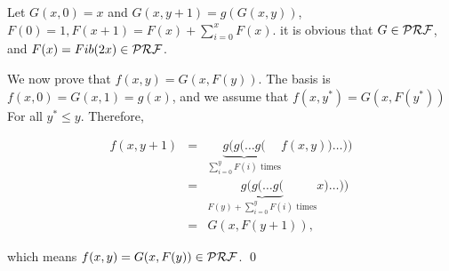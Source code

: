 
\begin{pf} \rm
 Let $G(x, 0) = x$ and $G(x, y + 1) = g(G(x, y))$,
 $F(0) = 1, F(x + 1) = F(x) + \sum_{i = 0}^{x} F(x)$. it is obvious that
 $G\in\mathcal{PRF}$, and $F(x) = Fib(2x) \in \mathcal{PRF}$.
 
 We now prove that $f(x, y) = G(x, F(y))$.
 The basis is $f(x, 0) = G(x, 1) = g(x)$, and we assume that
 $f(x, y^*) = G(x, F(y^*))$ For all $y^* \leq y$. Therefore, 

\[
 \begin{array}{rcl}
 f(x, y + 1)  & = &  \underbrace{g(g(\ldots g(}_{\sum_{i = 0}^{y} F(i)\textrm{ times}}
   f(x, y) )\ldots )) \\
 & = & \underbrace{g(g(\ldots g(}_{F(y) + \sum_{i = 0}^{y} F(i)\textrm{ times}}
   x )\ldots )) \\
   & = & G(x, F(y + 1)),
  \end{array}
\]

\noindent which means $f(x, y) = G(x, F(y))\in \mathcal{PRF}$. \qed
\end{pf}



